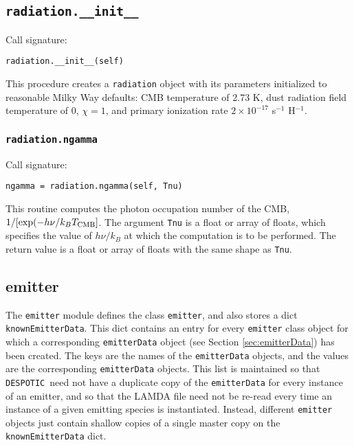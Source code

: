 \documentclass[12pt]{article}
\newcommand{\despotic}{\texttt{DESPOTIC}}
\begin{document}
\subsection{\texttt{radiation.\_\_init\_\_}}

Call signature:

\begin{verbatim}
radiation.__init__(self)
\end{verbatim}

This procedure creates a \verb=radiation= object with its parameters initialized to reasonable Milky Way defaults: CMB temperature of 2.73 K, dust radiation field temperature of 0, $\chi = 1$, and primary ionization rate $2\times 10^{-17}$ s$^{-1}$ H$^{-1}$.

\subsubsection{\texttt{radiation.ngamma}}

Call signature:

\begin{verbatim}
ngamma = radiation.ngamma(self, Tnu)
\end{verbatim}

This routine computes the photon occupation number of the CMB, $1/[\exp(-h\nu/k_B T_{\rm CMB}]$. The argument \verb=Tnu= is a float or array of floats, which specifies the value of $h\nu/k_B$ at which the computation is to be performed. The return value is a float or array of floats with the same shape as \verb=Tnu=.

\clearpage

\subsection{emitter}
\label{sec:emitter}

The \verb=emitter= module defines the class \verb=emitter=, and also stores a dict \verb=knownEmitterData=. This dict contains an entry for every \verb=emitter= class object for which a corresponding \verb=emitterData= object (see Section \ref{sec:emitterData}) has been created. The keys are the names of the \verb=emitterData= objects, and the values are the corresponding \verb=emitterData= objects. This list is maintained so that \despotic\ need not have a duplicate copy of the \verb=emitterData= for every instance of an emitter, and so that the LAMDA file need not be re-read every time an instance of a given emitting species is instantiated. Instead, different \verb=emitter= objects just contain shallow copies of a single master copy on the \verb=knownEmitterData= dict.
\end{document}
